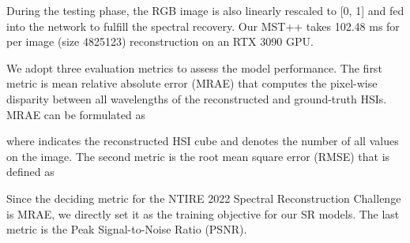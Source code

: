 \documentclass[10pt,twocolumn,letterpaper]{article}
\begin{document}
During the testing phase, the RGB image is also linearly rescaled to [0, 1] and fed into the network to fulfill the spectral recovery. Our MST++ takes 102.48 ms for per image (size 4825123) reconstruction on an RTX 3090 GPU.

We adopt three evaluation metrics to assess the model performance. The first metric is mean relative absolute error (MRAE) that computes the pixel-wise disparity between all wavelengths of the reconstructed and ground-truth HSIs. MRAE can be formulated as

where  indicates the reconstructed HSI cube and  denotes the number of all values on the image. The second metric is the root mean square error (RMSE) that is defined as

Since the deciding metric for the NTIRE 2022 Spectral Reconstruction Challenge is MRAE, we directly set it as the training objective for our SR  models. The last metric is the Peak Signal-to-Noise Ratio (PSNR).
\end{document}
